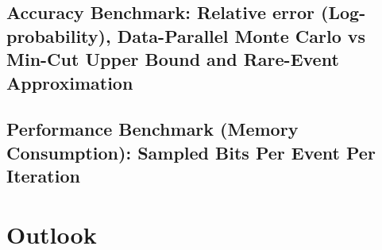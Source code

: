 \subsection{Accuracy Benchmark: Relative error (Log-probability), Data-Parallel Monte Carlo vs Min-Cut Upper Bound and Rare-Event Approximation}
\begin{frame}
    \begin{figure}[p]
        \centering
        
    \end{figure}
\end{frame}


\subsection{Performance Benchmark (Memory Consumption): Sampled Bits Per Event Per Iteration}
\begin{frame}
  \begin{multicols}{2}
    \begin{figure}[p]
        \centering
        
    \end{figure}
    \begin{figure}[p]
        \centering
        
    \end{figure}
  \end{multicols}

\end{frame}



\section{Outlook}
